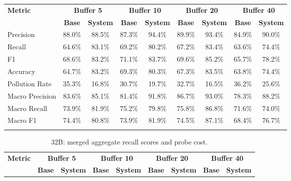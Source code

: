 \documentclass[pdflatex,sn-mathphys-num]{sn-jnl}%
\theoremstyle{thmstyleone}%
\theoremstyle{thmstyletwo}%
\theoremstyle{thmstylethree}%
\begin{document}
\begin{appendices}
\begin{landscape}
\begin{longtable}{@{}p{3.8cm}cccccccc@{}}
\toprule
\textbf{Metric} & \multicolumn{2}{c}{\textbf{Buffer 5}} & \multicolumn{2}{c}{\textbf{Buffer 10}} & \multicolumn{2}{c}{\textbf{Buffer 20}} & \multicolumn{2}{c}{\textbf{Buffer 40}} \\
\cmidrule(lr){2-3}\cmidrule(lr){4-5}\cmidrule(lr){6-7}\cmidrule(lr){8-9}
 & \textbf{Base} & \textbf{System} & \textbf{Base} & \textbf{System} & \textbf{Base} & \textbf{System} & \textbf{Base} & \textbf{System} \\
\midrule
\endhead
Precision & 88.0\% & 88.5\% & 87.3\% & 94.4\% & 89.9\% & 93.4\% & 84.9\% & 90.0\% \\
Recall & 64.6\% & 83.1\% & 69.2\% & 80.2\% & 67.2\% & 83.4\% & 63.6\% & 74.4\% \\
F1 & 68.6\% & 83.2\% & 71.1\% & 83.7\% & 69.6\% & 85.2\% & 65.7\% & 78.2\% \\
Accuracy & 64.7\% & 83.2\% & 69.3\% & 80.3\% & 67.3\% & 83.5\% & 63.8\% & 74.4\% \\
Pollution Rate & 35.3\% & 16.8\% & 30.7\% & 19.7\% & 32.7\% & 16.5\% & 36.2\% & 25.6\% \\
Macro Precision & 83.6\% & 85.1\% & 81.4\% & 91.8\% & 86.7\% & 93.0\% & 78.3\% & 88.2\% \\
Macro Recall & 73.9\% & 81.9\% & 75.2\% & 79.8\% & 75.8\% & 86.8\% & 71.6\% & 74.0\% \\
Macro F1 & 74.4\% & 80.8\% & 73.9\% & 81.9\% & 74.5\% & 87.1\% & 68.4\% & 76.7\% \\
\botrule
\end{longtable}
\normalsize
\end{landscape}
\begin{landscape}
\tiny
\begin{longtable}{@{}p{3.8cm}cccccccc@{}}
\caption{32B: merged aggregate recall scores and probe cost.}\label{tab:app_32b_recall_agg}\\

\toprule
\textbf{Metric} & \multicolumn{2}{c}{\textbf{Buffer 5}} & \multicolumn{2}{c}{\textbf{Buffer 10}} & \multicolumn{2}{c}{\textbf{Buffer 20}} & \multicolumn{2}{c}{\textbf{Buffer 40}} \\
\cmidrule(lr){2-3}\cmidrule(lr){4-5}\cmidrule(lr){6-7}\cmidrule(lr){8-9}
 & \textbf{Base} & \textbf{System} & \textbf{Base} & \textbf{System} & \textbf{Base} & \textbf{System} & \textbf{Base} & \textbf{System} \\
\midrule
\endfirsthead


\end{longtable}
\end{landscape}
\end{appendices}
\end{document}
